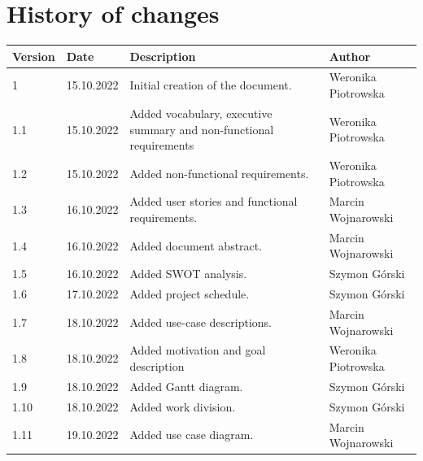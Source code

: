 \documentclass{article}
\newcommand{\currentversion}{1.11}
\begin{document}
\section*{History of changes}
\begin{center}
    \begin{tabular}{ |p{} | p{} | p{} | p{}| }
        \hline
        Version         & Date       & Description                                                         & Author              \\
        \hline
        1               & 15.10.2022 & Initial creation of the document.                                   & Weronika Piotrowska \\
        \hline
        1.1             & 15.10.2022 & Added vocabulary, executive summary and non-functional requirements & Weronika Piotrowska \\
        \hline
        1.2             & 15.10.2022 & Added non-functional requirements.                                  & Weronika Piotrowska \\
        \hline
        1.3             & 16.10.2022 & Added user stories and functional requirements.                     & Marcin Wojnarowski  \\
        \hline
        1.4             & 16.10.2022 & Added document abstract.                                            & Marcin Wojnarowski  \\
        \hline
        1.5             & 16.10.2022 & Added SWOT analysis.                                                & Szymon Górski       \\
        \hline
        1.6             & 17.10.2022 & Added project schedule.                                             & Szymon Górski       \\
        \hline
        1.7             & 18.10.2022 & Added use-case descriptions.                                        & Marcin Wojnarowski  \\
        \hline
        1.8             & 18.10.2022 & Added motivation and goal description                               & Weronika Piotrowska \\
        \hline
        1.9             & 18.10.2022 & Added Gantt diagram.                                                & Szymon Górski       \\
        \hline
        1.10            & 18.10.2022 & Added work division.                                                & Szymon Górski       \\
        \hline
        \currentversion & 19.10.2022 & Added use case diagram.                                             & Marcin Wojnarowski  \\
        \hline
    \end{tabular}
\end{center}
\end{document}
